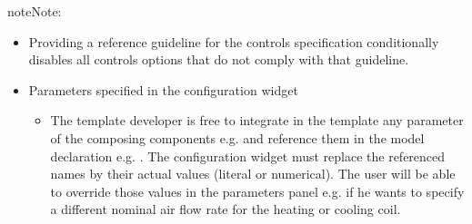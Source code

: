 \documentclass[letterpaper,10pt, openany,english]{sphinxmanual}
\begin{document}
\begin{sphinxadmonition}{note}{Note:}
\begin{itemize}
\begin{itemize}
\begin{itemize}
\end{itemize}

\item {} 
\begin{itemize}
\item {} 
auto-referencing the data structure e.g.  refers to the value of the field  of the object which  is ,

\item {} 
conditional statements: potentially every field might require a conditional statement \textendash{} either data fields (e.g. the model to be instantiated and its placement) or UI fields (e.g. the condition to enable a widget itself or the different options of a menu widget).

\item {} 
(Ideally the syntax would also allow iteration  loops to instantiate a given number (as parameter) of objects with an offset applied to the placement coordinates e.g. chiller plant with  chillers. Backup strategy: define all (e.g. 10) possible instances and enable only the first  ones based on a condition.)

\end{itemize}

\end{itemize}

\item {} 
Providing a reference guideline for the controls specification conditionally disables all controls options that do not comply with that guideline.

\item {} 
Parameters specified in the configuration widget
\begin{itemize}
\item {} 
The template developer is free to integrate in the template any parameter of the composing components e.g.  and reference them in the model declaration e.g. . The configuration widget must replace the referenced names by their actual values (literal or numerical). The user will be able to override those values in the parameters panel e.g. if he wants to specify a different nominal air flow rate for the heating or cooling coil.


\end{itemize}
\end{itemize}
\end{sphinxadmonition}
\end{document}
